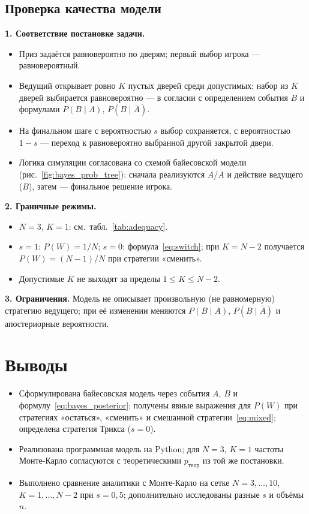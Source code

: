 \documentclass[a4paper, 14pt]{extarticle}
\begin{document}
\subsection{Проверка качества модели}

\textbf{1. Соответствие постановке задачи.}
\begin{itemize}[nosep]
  \item Приз задаётся равновероятно по дверям; первый выбор игрока --- равновероятный.
  \item Ведущий открывает ровно $K$ пустых дверей среди допустимых; набор из $K$ дверей выбирается равновероятно --- в согласии с определением события $B$ и формулами $P(B\mid A)$, $P(B\mid \overline{A})$.
  \item На финальном шаге с вероятностью $s$ выбор сохраняется, с вероятностью $1-s$ --- переход к равновероятно выбранной другой закрытой двери.
  \item Логика симуляции согласована со схемой байесовской модели (рис.~\ref{fig:bayes_prob_tree}): сначала реализуются $A$/$\overline{A}$ и действие ведущего ($B$), затем --- финальное решение игрока.
\end{itemize}

\textbf{2. Граничные режимы.}
\begin{itemize}[nosep]
  \item $N=3$, $K=1$: см.~табл.~\ref{tab:adequacy}.
  \item $s=1$: $P(W)=1/N$; $s=0$: формула~\eqref{eq:switch}; при $K=N-2$ получается $P(W)=(N-1)/N$ при стратегии «сменить».
  \item Допустимые $K$ не выходят за пределы $1\le K\le N-2$.
\end{itemize}

\textbf{3. Ограничения.}
Модель не описывает произвольную (не равномерную) стратегию ведущего; при её изменении меняются $P(B\mid A)$, $P(B\mid \overline{A})$ и апостериорные вероятности.

\section{Выводы}

\begin{itemize}[nosep]
  \item Сформулирована байесовская модель через события $A$, $B$ и формулу~\eqref{eq:bayes_posterior}; получены явные выражения для $P(W)$ при стратегиях «остаться», «сменить» и смешанной стратегии~\eqref{eq:mixed}; определена стратегия Трикса ($s=0$).
  \item Реализована программная модель на Python; для $N=3$, $K=1$ частоты Монте-Карло согласуются с теоретическими $p_{\text{теор}}$ из той же постановки.
  \item Выполнено сравнение аналитики с Монте-Карло на сетке $N=3,\ldots,10$, $K=1,\ldots,N-2$ при $s=0{,}5$; дополнительно исследованы разные $s$ и объёмы $n$.
\end{itemize}
\end{document}
